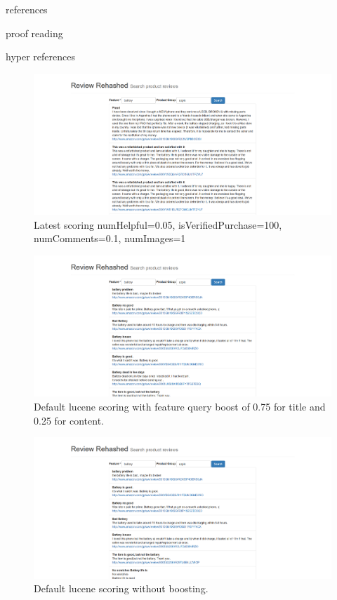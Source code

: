 \documentclass{article}
\begin{document}
\begin{description}
\item references
\item proof reading
\item hyper references

\begin{figure}[ht!]
  \centering
  \includegraphics[width=1\textwidth]{scoring_piecewise_normalization}
  \caption{Latest scoring numHelpful=0.05, isVerifiedPurchase=100, numComments=0.1, numImages=1~\label{fig:Search_Engine}}
\end{figure}

\begin{figure}[ht!]
  \centering
  \includegraphics[width=1\textwidth]{noscoring}
  \caption{Default lucene scoring with feature query boost of 0.75 for title and 0.25 for content.~\label{fig:Search_Engine}}
\end{figure}

\begin{figure}[ht!]
  \centering
  \includegraphics[width=1\textwidth]{noboosting}
  \caption{Default lucene scoring without boosting.~\label{fig:Search_Engine}}
\end{figure}


\end{description}
\end{document}
